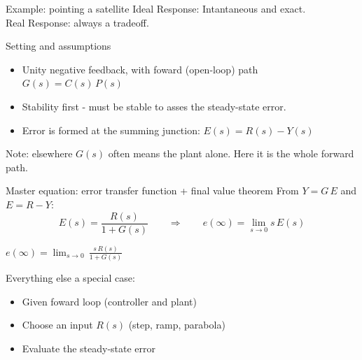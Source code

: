 \documentclass[aspectratio=169,12pt]{beamer}
\begin{document}
\begin{frame}{Example: pointing a satellite}
  \bigskip
  \centering Ideal Response: Intantaneous and exact. \\
  Real Response: always a \alert{tradeoff}.
\end{frame}

\begin{frame}{Setting and assumptions}
  \begin{center}
  \end{center}

  \begin{itemize}
    \item Unity negative feedback, with foward (open-loop) path $G(s) = C(s)\,P(s)$
    \item Stability first - must be stable to asses the steady-state error.
    \item Error is formed at the summing junction: $E(s) = R(s) - Y(s)$
  \end{itemize}

  \small Note: elsewhere $G(s)$ often means the plant alone. Here it is the whole forward path.
\end{frame}

\begin{frame}{Master equation: error transfer function + final value theorem}
  From $Y = G\,E$ and $E = R - Y$:
  \[
    E(s) = \frac{R(s)}{1+G(s)}
    \qquad\Longrightarrow\qquad
    e(\infty) = \lim_{s\to 0} s\,E(s)
  \]

  \begin{center}
  \colorbox{navy!8}{\parbox{0.5\textwidth}{\centering\vspace{0.4em}
    $\displaystyle e(\infty) = \lim_{s\to 0}\,\frac{s\,R(s)}{1+G(s)}$
  \vspace{0.4em}}}
  \end{center}

  \medskip
  Everything else a special case:
  \begin{itemize}
    \item Given foward loop (controller and plant)
    \item Choose an input $R(s)$ (step, ramp, parabola)
    \item Evaluate the steady-state error 
  \end{itemize}
\end{frame}
\end{document}
